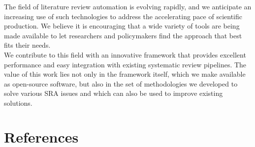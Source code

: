 \documentclass{article}
\begin{document}
The field of literature review automation is evolving rapidly, and we
anticipate an increasing use of such technologies to address the
accelerating pace of scientific production. We believe it is encouraging
that a wide variety of tools are being made available to let researchers
and policymakers find the approach that best fits their needs.\\
We contribute to this field with an innovative framework that provides
excellent performance and easy integration with existing systematic
review pipelines. The value of this work lies not only in the framework
itself, which we make available as open-source software, but also in the
set of methodologies we developed to solve various SRA issues and which
can also be used to improve existing solutions.\\

\newpage

\hypertarget{references}{%
\section*{References}\label{references}}
\end{document}
